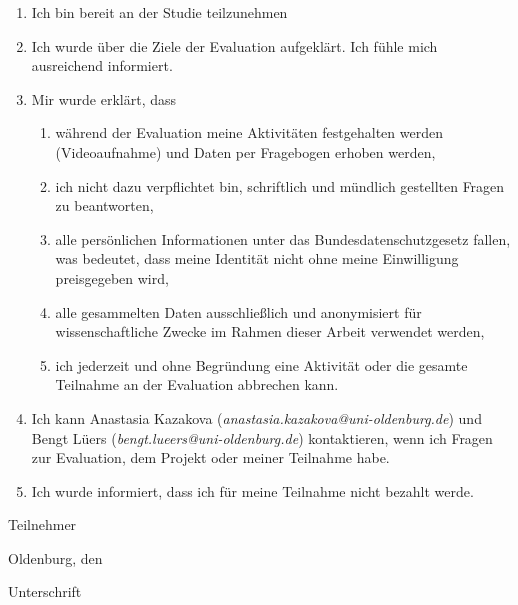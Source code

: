 \documentclass[10pt,a4paper,oneside]{article}
\author{Anastasia Kazakova}
\begin{document}
\pagestyle{empty}

\begin{enumerate}

\item Ich bin bereit an der Studie teilzunehmen
\item Ich wurde über die Ziele der Evaluation aufgeklärt. Ich fühle mich ausreichend informiert.
\item  Mir wurde erklärt, dass
\begin{enumerate}
\item während der Evaluation meine Aktivitäten festgehalten werden (Videoaufnahme) und Daten per Fragebogen erhoben werden,
\item ich nicht dazu verpflichtet bin, schriftlich und mündlich gestellten Fragen zu beantworten,
\item alle persönlichen Informationen unter das  Bundesdatenschutzgesetz fallen, was bedeutet, dass meine Identität nicht ohne meine Einwilligung preisgegeben wird,
\item alle gesammelten Daten ausschließlich und anonymisiert für wissenschaftliche Zwecke im Rahmen dieser Arbeit verwendet werden,
\item ich jederzeit und ohne Begründung eine Aktivität oder die gesamte Teilnahme an der Evaluation abbrechen kann.
\end{enumerate}
\item Ich kann Anastasia Kazakova (\textit{anastasia.kazakova@uni-oldenburg.de}) und Bengt Lüers (\textit{bengt.lueers@uni-oldenburg.de}) kontaktieren, wenn ich Fragen zur Evaluation, dem Projekt oder meiner Teilnahme habe.
\item Ich wurde informiert, dass ich für meine Teilnahme nicht bezahlt werde.
\end{enumerate}

\vspace{2cm}

Teilnehmer \hrulefill

\vspace{1cm}

Oldenburg, den \hrulefill

\vspace{1cm}

Unterschrift \hrulefill
\end{document}
